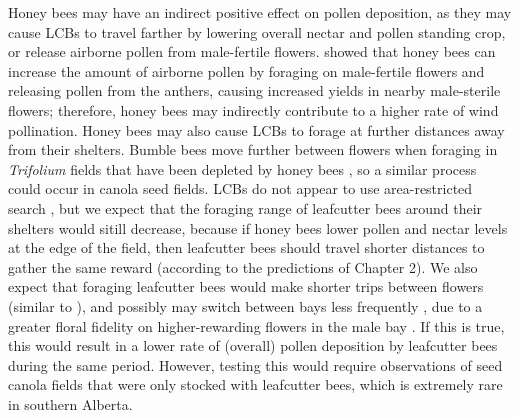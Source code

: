 \documentclass[12pt]{article} %
\begin{document}

Honey bees may have an indirect positive effect on pollen deposition, as they may cause LCBs to travel farther by lowering overall nectar and pollen standing crop, or release airborne pollen from male-fertile flowers.
\citet{pierre2010} showed that honey bees can increase the amount of airborne pollen by foraging on male-fertile flowers and releasing pollen from the anthers, causing increased yields in nearby male-sterile flowers; therefore, honey bees may indirectly contribute to a higher rate of wind pollination.
Honey bees may also cause LCBs to forage at further distances away from their shelters.
Bumble bees move further between flowers when foraging in \textit{Trifolium} fields that have been depleted by honey bees \citet{heinrich1979}, so a similar process could occur in canola seed fields. 
LCBs do not appear to use area-restricted search \citep{brunet2019}, but we expect that the foraging range of leafcutter bees around their shelters would sitill decrease, because if honey bees lower pollen and nectar levels at the edge of the field, then leafcutter bees should travel shorter distances to gather the same reward (according to the predictions of Chapter 2).
We also expect that foraging leafcutter bees would make shorter trips between flowers (similar to \citealp{heinrich1979}), and possibly may switch between bays less frequently \citep{waytesMsc,gaffney2019}, due to a greater floral fidelity on higher-rewarding flowers in the male bay \citep{mesquida1978}.
If this is true, this would result in a lower rate of (overall) pollen deposition by leafcutter bees during the same period.
However, testing this would require observations of seed canola fields that were only stocked with leafcutter bees, which is extremely rare in southern Alberta.
\end{document}
